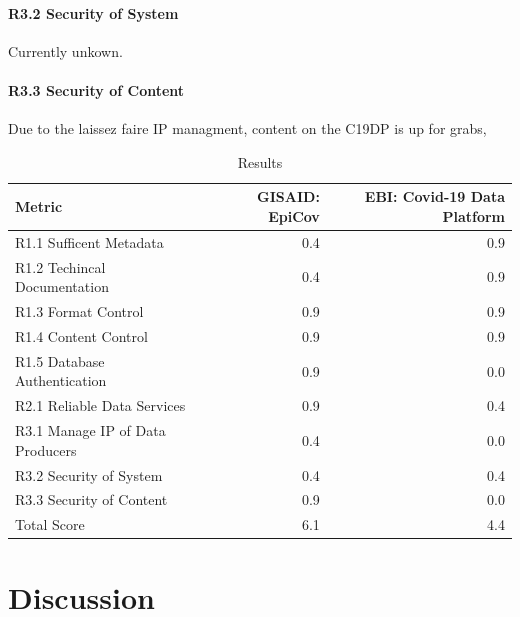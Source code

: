 \documentclass{article}
\begin{document}
\hypertarget{r3.2-security-of-system-1}{%
\paragraph{R3.2 Security of System}\label{r3.2-security-of-system-1}}

Currently unkown.

\hypertarget{r3.3-security-of-content-1}{%
\paragraph{R3.3 Security of Content}\label{r3.3-security-of-content-1}}

Due to the laissez faire IP managment, content on the C19DP is up for
grabs,

\begin{table}[H]

\caption{\label{tab:fig3}Results}
\centering
\begin{tabular}[t]{l|r|r}
\hline
Metric & GISAID: EpiCov & EBI: Covid-19 Data Platform\\
\hline
R1.1 Sufficent Metadata & 0.4 & 0.9\\
\hline
R1.2 Techincal Documentation & 0.4 & 0.9\\
\hline
R1.3 Format Control & 0.9 & 0.9\\
\hline
R1.4 Content Control & 0.9 & 0.9\\
\hline
R1.5  Database Authentication & 0.9 & 0.0\\
\hline
R2.1 Reliable Data Services & 0.9 & 0.4\\
\hline
R3.1 Manage IP of Data Producers & 0.4 & 0.0\\
\hline
R3.2 Security of System & 0.4 & 0.4\\
\hline
R3.3 Security of Content & 0.9 & 0.0\\
\hline
Total Score & 6.1 & 4.4\\
\hline
\end{tabular}
\end{table}

\hypertarget{discussion}{%
\section{Discussion}\label{discussion}}
\end{document}
